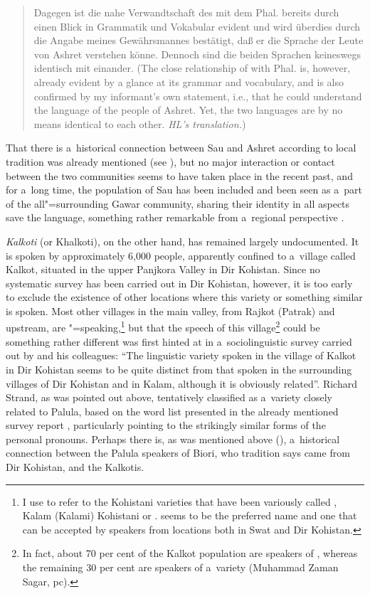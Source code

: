 \begin{quote}
Dagegen ist die nahe Verwandtschaft des \iliSawi mit dem Phal. bereits durch einen Blick in Grammatik und Vokabular evident und wird überdies durch die Angabe meines Gewährsmannes bestätigt, daß er die Sprache der Leute von Ashret verstehen könne. Dennoch sind die beiden Sprachen keineswegs identisch mit einander. (The close relationship of \iliSawi with Phal. is, however, already evident by a glance at its grammar and vocabulary, and is also confirmed by my informant's own statement, i.e., that he could understand the language of the people of Ashret. Yet, the two languages are by no means identical to each other. \textit{HL's translation.}) \citep[11]{buddruss1967}
\end{quote}


That there is a~historical connection between Sau and Ashret according to local tradition was
already mentioned (see ), but no major interaction or
contact between the two communities seems to have taken place in the recent past, and for a~long
time, the population of Sau has been included and been seen as a~part of the all"=surrounding Gawar
community, sharing their identity in all aspects save the language, something rather remarkable from
a~regional perspective \citep[232]{cacopardo2001}.
 
\textit{Kalkoti} (or Khalkoti), on the other hand, has remained largely undocumented. It is spoken by approximately 6,000 people, apparently confined to a~village called Kalkot, situated in the upper Panjkora Valley in Dir Kohistan. Since no systematic survey has been carried out in Dir Kohistan, however, it is too early to exclude the existence of other locations where this variety or something similar is spoken. Most other villages in the main valley, from Rajkot (Patrak) and upstream, are \iliGawri"=speaking,\footnote{I use \iliGawri to refer to the Kohistani varieties that have been variously called \iliBashkarik, Kalam (Kalami) Kohistani or \iliDirKohistani. \iliGawri seems to be the preferred name and one that can be accepted by speakers from locations both in Swat and Dir Kohistan.} but that the speech of this village\footnote{In fact, 
  about 70 per cent of the Kalkot population are speakers of \iliKalkoti, whereas the remaining 30 per cent are speakers of a~\iliGawri variety (Muhammad Zaman Sagar, pc).} could be something rather different was first hinted at in a~sociolinguistic survey carried out by \citet[7]{rensch1992} and his colleagues: ``The linguistic variety spoken in the village of Kalkot in Dir Kohistan seems to be quite distinct from that spoken in the surrounding villages of Dir Kohistan and in Kalam, although it is obviously related''. Richard Strand, as was pointed out above, tentatively classified \iliKalkoti as a~\iliShina variety closely related to Palula, based on the word list presented in the already mentioned survey report \citep[159--176]{rensch1992}, particularly pointing to the strikingly similar forms of the personal pronouns. Perhaps there is, as was mentioned above (), a~historical connection between the Palula speakers of Biori, who tradition says came from Dir Kohistan, and the Kalkotis.


